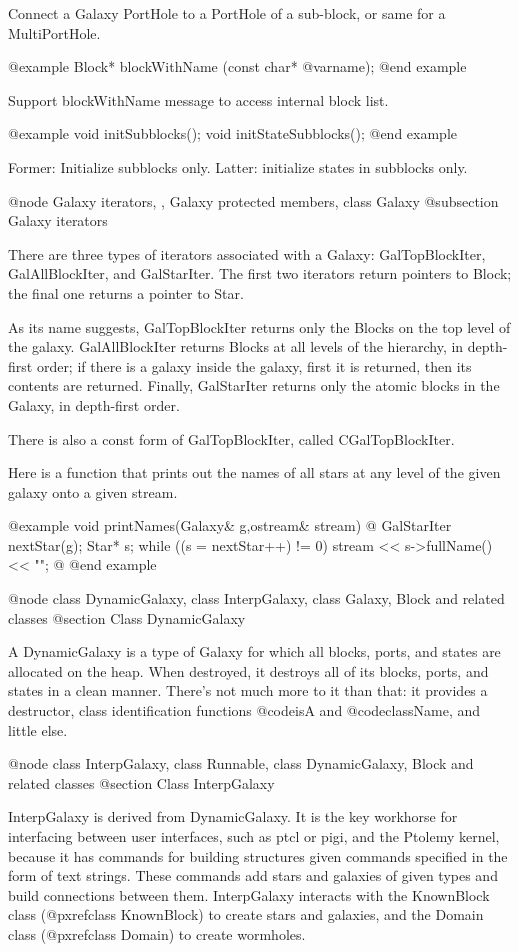 Connect a Galaxy PortHole to a PortHole of a sub-block, or same for
a MultiPortHole.


@example
Block* blockWithName (const char* @var{name});
@end example

Support blockWithName message to access internal block list.

@example
void initSubblocks();
void initStateSubblocks();
@end example

Former: Initialize subblocks only.  Latter: initialize states in
subblocks only.

@node Galaxy iterators,  , Galaxy protected members, class Galaxy
@subsection Galaxy iterators

There are three types of iterators associated with a Galaxy:
GalTopBlockIter, GalAllBlockIter, and GalStarIter.  The first
two iterators return pointers to Block; the final one returns
a pointer to Star.

As its name suggests, GalTopBlockIter returns only the Blocks
on the top level of the galaxy.  GalAllBlockIter returns
Blocks at all levels of the hierarchy, in depth-first order;
if there is a galaxy inside the galaxy, first it is returned,
then its contents are returned.  Finally, GalStarIter returns
only the atomic blocks in the Galaxy, in depth-first order.

There is also a const form of GalTopBlockIter, called CGalTopBlockIter.

Here is a function that prints out the names of all stars at any
level of the given galaxy onto a given stream.

@example
void printNames(Galaxy& g,ostream& stream) @{
    GalStarIter nextStar(g);
    Star* s;
    while ((s = nextStar++) != 0)
        stream << s->fullName() << "\n";
@}
@end example

@node class DynamicGalaxy, class InterpGalaxy, class Galaxy, Block and related classes
@section Class DynamicGalaxy

A DynamicGalaxy is a type of Galaxy for which all blocks, ports, and
states are allocated on the heap.  When destroyed, it destroys all of
its blocks, ports, and states in a clean manner.  There's not much
more to it than that: it provides a destructor, class identification
functions @code{isA} and @code{className}, and little else.

@node class InterpGalaxy, class Runnable, class DynamicGalaxy, Block and related classes
@section Class InterpGalaxy

InterpGalaxy is derived from DynamicGalaxy.  It is the key workhorse
for interfacing between user interfaces, such as ptcl or pigi, and
the Ptolemy kernel, because it has commands for building structures
given commands specified in the form of text strings.  These commands
add stars and galaxies of given types and build connections between
them.  InterpGalaxy interacts with the KnownBlock class
(@pxref{class KnownBlock}) to create stars and galaxies,
and the Domain class (@pxref{class Domain}) to create wormholes.


